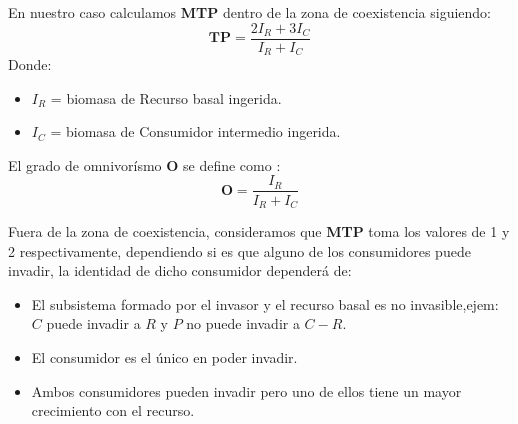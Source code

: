 En nuestro caso calculamos \textbf{MTP} dentro de la zona de coexistencia siguiendo:
\begin{equation} \mathbf{TP}= \frac{2 I_R + 3 I_C}{I_R+I_C} \end{equation}
Donde:
\begin{itemize}
\item $I_R$ = biomasa de Recurso basal ingerida.
\item $I_C$ = biomasa de Consumidor intermedio ingerida.
\end{itemize}
El grado de omnivor\'ismo $\mathbf{O}$ se define como \citep{TP2007proximate}:
\begin{equation} \mathbf{O}= \frac{I_R}{I_R+I_C} \end{equation}

Fuera de la zona de coexistencia, consideramos que \textbf{MTP} toma los valores de 1 y 2 respectivamente, dependiendo si es que alguno de los consumidores puede invadir, la identidad de dicho consumidor depender\'a de: 
\begin{itemize}
\item El subsistema formado por el invasor y el recurso basal es no invasible,ejem: $C$ puede invadir a $R$ y $P$ no puede invadir a $C-R$.
\item El consumidor es el \'unico en poder invadir.
\item Ambos consumidores pueden invadir pero uno de ellos tiene un mayor crecimiento con el recurso.
\end{itemize}
